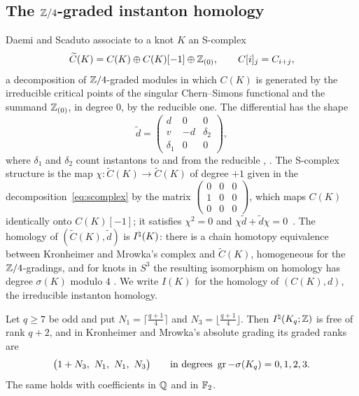 \subsection{The \texorpdfstring{$\mathbb{Z}/4$}{Z/4}-graded instanton homology}\label{ss:graded}
Daemi and Scaduto associate to a knot $K$ an S-complex
\begin{equation}\label{eq:scomplex}
 \widetilde C(K)=C(K)\oplus C(K)[-1]\oplus\mathbb{Z}_{(0)},\qquad C[i]_j=C_{i+j},
\end{equation}
a decomposition of $\mathbb{Z}/4$-graded modules in which $C(K)$ is generated by the irreducible critical points
of the singular Chern--Simons functional and the summand $\mathbb{Z}_{(0)}$, in degree $0$, by the reducible one.
The differential has the shape
\[
 \widetilde d=\begin{pmatrix}d&0&0\\ v&-d&\delta_2\\ \delta_1&0&0\end{pmatrix},
\]
where $\delta_1$ and $\delta_2$ count instantons to and from the reducible
\cite[Def.~2.1 and (1.9)]{DS24}, \cite[Def.~3.21]{DS19}. The S-complex structure is the map
$\chi\colon\widetilde C(K)\to\widetilde C(K)$ of degree $+1$ given in the decomposition~\eqref{eq:scomplex} by the matrix $\left(\begin{smallmatrix}0&0&0\\ 1&0&0\\ 0&0&0\end{smallmatrix}\right)$, which maps $C(K)$ identically onto $C(K)[-1]$; it satisfies
$\chi^2=0$ and $\chi\widetilde d+\widetilde d\chi=0$~\cite[\S4.1]{DS19}. The homology of $(\widetilde C(K),\widetilde d)$ is
$I^{\natural}(K)$: there is a chain
homotopy equivalence between Kronheimer and Mrowka's complex and $\widetilde C(K)$, homogeneous for the
$\mathbb{Z}/4$-gradings, and for knots in $S^3$ the resulting isomorphism on homology has degree $\sigma(K)$
modulo $4$ \cite[Thm.~8.9]{DS19}. We write $I(K)$ for the homology of $(C(K),d)$, the irreducible
instanton homology.

\begin{proposition}\label{prop:inat-graded}
Let $q\ge7$ be odd and put $N_1=\lceil\frac{q+1}4\rceil$ and $N_3=\lfloor\frac{q+1}4\rfloor$. Then
$I^{\natural}(K_q;\mathbb{Z})$ is free of rank $q+2$, and in Kronheimer and Mrowka's absolute grading its graded
ranks are
\begin{equation}\label{eq:graded-vector}
 \bigl(1+N_3,\ N_1,\ N_1,\ N_3\bigr)\qquad\text{in degrees}\ \gr-\sigma(K_q)=0,1,2,3 .
\end{equation}
The same holds with coefficients in $\mathbb{Q}$ and in $\mathbb{F}_2$.
\end{proposition}

